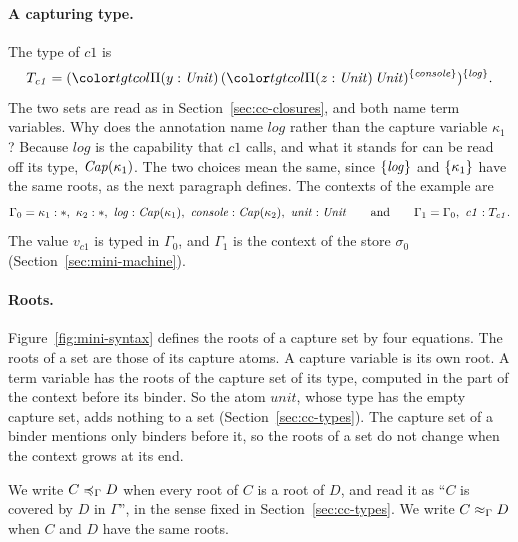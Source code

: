 \paragraph{A capturing type.}
The type of $\mathit{c1}$ is
\[
T_{\mathit{c1}} = \capt{(\pit[y]{\Unit}{\capt{(\pit[z]{\Unit}{\Unit})}{\cset{\mathit{console}}}})}{\cset{\mathit{log}}} .
\]
The two sets are read as in Section~\ref{sec:cc-closures}, and both name term variables. Why does the annotation name $\mathit{log}$ rather than the capture variable $\kappa_1$? Because $\mathit{log}$ is the capability that $\mathit{c1}$ calls, and what it stands for can be read off its type, $\mathit{Cap}(\kappa_1)$. The two choices mean the same, since $\{\mathit{log}\}$ and $\{\kappa_1\}$ have the same roots, as the next paragraph defines. The contexts of the example are
\[
\Gamma_0 = \kappa_1 : \ast,\ \kappa_2 : \ast,\ \mathit{log} : \mathit{Cap}(\kappa_1),\ \mathit{console} : \mathit{Cap}(\kappa_2),\ \mathit{unit} : \mathit{Unit}
\qquad\text{and}\qquad
\Gamma_1 = \Gamma_0,\ \mathit{c1} : T_{\mathit{c1}} .
\]
The value $v_{\mathit{c1}}$ is typed in $\Gamma_0$, and $\Gamma_1$ is the context of the store $\sigma_0$ (Section~\ref{sec:mini-machine}).

\paragraph{Roots.}
Figure~\ref{fig:mini-syntax} defines the roots of a capture set by four equations. The roots of a set are those of its capture atoms. A capture variable is its own root. A term variable has the roots of the capture set of its type, computed in the part of the context before its binder. So the atom $\mathit{unit}$, whose type has the empty capture set, adds nothing to a set (Section~\ref{sec:cc-types}). The capture set of a binder mentions only binders before it, so the roots of a set do not change when the context grows at its end.

We write $C \preccurlyeq_{\Gamma} D$ when every root of $C$ is a root of $D$, and read it as ``$C$ is covered by $D$ in $\Gamma$'', in the sense fixed in Section~\ref{sec:cc-types}. We write $C \approx_{\Gamma} D$ when $C$ and $D$ have the same roots.

